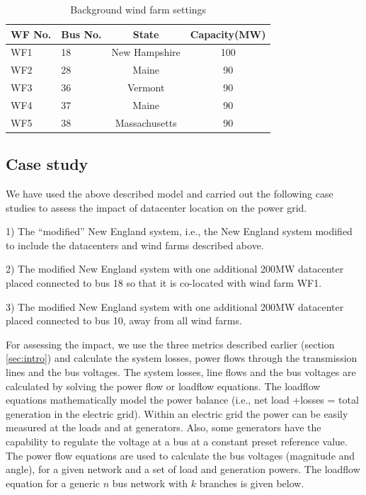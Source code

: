 \begin{table}[ht]
\begin{center}
\caption{Background wind farm settings}
\begin{tabular}{|l|l|c|c|}
\hline
WF No. & Bus No. & State & Capacity(MW) \\
\hline
WF1 & 18& New Hampshire & 100\\
WF2 & 28& Maine & 90 \\
WF3 & 36& Vermont & 90  \\
WF4 & 37& Maine & 90\\
WF5 & 38& Massachusetts & 90\\
\hline

\end{tabular}
   \vspace{.05in}
\label{tab:wf_setting}
\end{center}
\end{table}

\subsection{Case study}
\label{sec:casestudy}
We have used the above described model and carried out the following case studies to assess the impact of datacenter location on the power grid.

1) The ``modified'' New England system, i.e., the New England system modified to include the datacenters and wind farms described above.

2) The modified New England system with one additional 200MW datacenter placed connected to bus 18 so that it is co-located with wind farm WF1.

3) The modified New England system with one additional 200MW datacenter placed connected to bus 10, away from all wind farms.

For assessing the impact, we use the three metrics described earlier (section \ref{sec:intro}) and calculate the system losses, power flows through the transmission lines and the bus voltages.  The system losses, line flows and the bus voltages are calculated by solving the power flow or loadflow equations. The loadflow equations mathematically model the power balance (i.e., net load +losses = total generation in the electric grid). Within an electric grid the power can be easily measured at the loads and at generators. Also, some generators have the capability to regulate the voltage at a bus at a constant preset reference value. The power flow equations are used to calculate the bus voltages (magnitude and angle), for a given network and a set of load and generation powers. The loadflow equation for a generic $n$ bus network with $k$ branches is given below.

